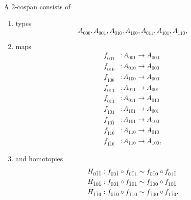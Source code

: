 \begin{defn}
A $2$-cospan consists of 
\begin{enumerate}
\item types
\begin{equation*}
A_{000},A_{001},A_{010},A_{100},A_{011},A_{101},A_{110},
\end{equation*}
\item maps
\begin{align*}
f_{00\check{1}} & : A_{001}\to A_{000} \\
f_{0\check{1}0} & : A_{010}\to A_{000} \\
f_{\check{1}00} & : A_{100}\to A_{000} \\
f_{0\check{1}1} & : A_{011}\to A_{001} \\
f_{01\check{1}} & : A_{011}\to A_{010} \\
f_{\check{1}01} & : A_{101}\to A_{001} \\
f_{10\check{1}} & : A_{101}\to A_{100} \\
f_{\check{1}10} & : A_{110}\to A_{010} \\
f_{1\check{1}0} & : A_{110}\to A_{100},
\end{align*}
\item and homotopies
\begin{align*}
H_{0\check{1}\check{1}} & : f_{00\check{1}}\circ f_{0\check{1}1} \sim f_{0\check{1}0}\circ f_{01\check{1}} \\
H_{\check{1}0\check{1}} & : f_{00\check{1}}\circ f_{\check{1}01} \sim f_{\check{1}00}\circ f_{10\check{1}} \\
H_{\check{1}\check{1}0} & : f_{0\check{1}0}\circ f_{\check{1}10} \sim f_{\check{1}00}\circ f_{1\check{1}0}.
\end{align*}
\end{enumerate}
\end{defn}

